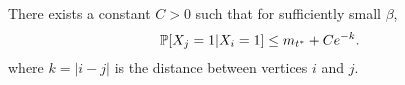 	\begin{lemma}
		There exists a constant $C > 0$ such that for sufficiently small $\beta$,
		\label{lem:nd X_j given X_i}
		\begin{equation}
			\mathbb{P}[X_j = 1| X_i = 1] \leq m_{t^*} + C e^{-k}.
		\end{equation}
		where $k = |i - j|$ is the distance between vertices $i$ and $j$.
	\end{lemma}
